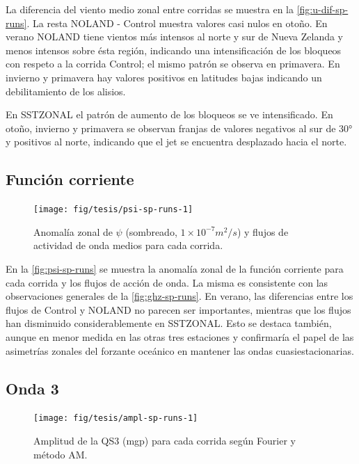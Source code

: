 \documentclass[spanish,a4paper,12pt,oneside]{book}
\begin{document}
La diferencia del viento medio zonal entre corridas se muestra en la
\autoref{fig:u-dif-sp-runs}. La resta NOLAND - Control muestra valores
casi nulos en otoño. En verano NOLAND tiene vientos más intensos al
norte y sur de Nueva Zelanda y menos intensos sobre ésta región,
indicando una intensificación de los bloqueos con respeto a la corrida
Control; el mismo patrón se observa en primavera. En invierno y
primavera hay valores positivos en latitudes bajas indicando un
debilitamiento de los alisios.

En SSTZONAL el patrón de aumento de los bloqueos se ve intensificado. En
otoño, invierno y primavera se observan franjas de valores negativos al
sur de 30° y positivos al norte, indicando que el jet se encuentra
desplazado hacia el norte.

\subsection{Función corriente}\label{funcion-corriente-3}

\begin{landscape}\begin{figure}

{\centering \texttt{[image: fig/tesis/psi-sp-runs-1]} 

}

\caption{Anomalía zonal de $\psi$ (sombreado,  $1\times10^{-7}m^2/s$) y flujos de actividad de onda medios para cada corrida.}\label{fig:psi-sp-runs}
\end{figure}
\end{landscape}

En la \autoref{fig:psi-sp-runs} se muestra la anomalía zonal de la
función corriente para cada corrida y los flujos de acción de onda. La
misma es consistente con las observaciones generales de la
\autoref{fig:ghz-sp-runs}. En verano, las diferencias entre los flujos
de Control y NOLAND no parecen ser importantes, mientras que los flujos
han disminuido considerablemente en SSTZONAL. Esto se destaca también,
aunque en menor medida en las otras tres estaciones y confirmaría el
papel de las asimetrías zonales del forzante oceánico en mantener las
ondas cuasiestacionarias.

\subsection{Onda 3}\label{onda-3-2}

\begin{landscape}\begin{figure}

{\centering \texttt{[image: fig/tesis/ampl-sp-runs-1]} 

}

\caption{Amplitud de la QS3 (mgp) para cada corrida según Fourier y método AM.}\label{fig:ampl-sp-runs}
\end{figure}
\end{landscape}
\end{document}
